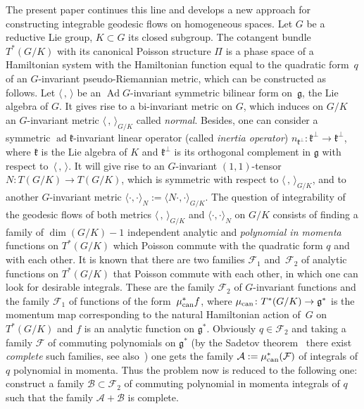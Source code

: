 \documentclass[pdftex]{sigma}
\numberwithin{equation}{section}
\begin{document}
The present paper continues this line and develops a new approach for constructing integrable geodesic flows on homogeneous spaces. Let $G$ be a reductive Lie group, $K \subset G$ its closed subgroup. The cotangent bundle $T^*(G/K)$ with its canonical Poisson structure $\Pi$ is a phase space of a Hamiltonian system with the Hamiltonian function equal to the quadratic form~$q$ of an $G$-invariant pseudo-Riemannian metric, which can be constructed as follows. Let $\langle\,,\,\rangle$ be an $\operatorname{Ad} G$-invariant symmetric bilinear form on~$\mathfrak{g}$, the Lie algebra of $G$. It gives rise to a bi-invariant metric on $G$, which induces on $G/K$ an $G$-invariant metric $\langle\,,\,\rangle_{G/K}$ called \emph{normal}. Besides, one can consider a symmetric $\operatorname{ad} \mathfrak{k}$-invariant linear operator (called \emph{inertia operator}) $n_{\mathfrak{k}^\perp}\colon \mathfrak{k}^\perp\to\mathfrak{k}^\perp$, where $\mathfrak{k}$ is the Lie algebra of $K$ and $\mathfrak{k}^\perp$ is its orthogonal complement in $\mathfrak{g}$ with respect to~$\langle\,,\,\rangle$. It will give rise to an $G$-invariant $(1,1)$-tensor $N\colon T(G/K)\to T(G/K)$, which is symmetric with respect to $\langle\,,\,\rangle_{G/K}$, and to another $G$-invariant metric $\langle\cdot,\cdot\rangle_N:=\langle N\cdot,\cdot\rangle_{G/K}$. The question of integrability of the geodesic flows of both metrics $\langle\,,\,\rangle_{G/K}$ and $\langle\cdot,\cdot\rangle_N$ on $G/K$ consists of finding a family of $\dim(G/K)-1$ independent analytic and \emph{polynomial in momenta} functions on $T^*(G/K)$ which Poisson commute with the quadratic form $q$ and with each other. It is known \cite[Section~5]{bjObzor} that there are two families $\mathcal{F}_1$ and~$\mathcal{F}_2$ of analytic functions on $T^*(G/K)$ that Poisson commute with each other, in which one can look for desirable integrals. These are the family $\mathcal{F}_2$ of $G$-invariant functions and the family $\mathcal{F}_1$ of functions of the form~$\mu_{\rm can}^*f$, where $\mu_{\rm can}\colon T^*(G/K)\to\mathfrak{g}^*$ is the momentum map corresponding to the natural Hamiltonian action of~$G$ on $T^*(G/K)$ and $f$ is an analytic function on $\mathfrak{g}^*$. Obviously $q\in\mathcal{F}_2$ and taking a family $\mathcal{F}$ of commuting polynomials on $\mathfrak{g}^*$ (by the Sadetov theorem~\cite{sadetov} there exist \emph{complete} such families, see also~\cite{bolsinov16}) one gets the family $\mathcal{A}:=\mu_{\rm can}^*(\mathcal{F})$ of integrals of $q$ polynomial in momenta. Thus the problem now is reduced to the following one: construct a family $\mathcal {B}\subset\mathcal{F}_2$ of commuting polynomial in momenta integrals of $q$ such that the family $\mathcal{A}+\mathcal {B}$ is complete.
\end{document}
